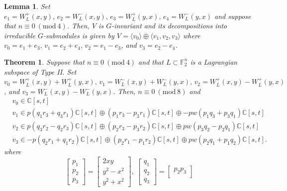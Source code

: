 \documentclass[10pt,a4paper]{amsart}
\newtheorem{lemma}{Lemma}
\newtheorem{theorem}{Theorem}
\begin{document}
\begin{lemma}\label{repG_n=0(4)}
    Set \(e_1 = W_L^+(x,y),\, e_2 = W_L^-(x,y),\, e_3 = W_L^+(y,x),\, e_4 = W_L^-(y,x)\) and suppose that \(n \equiv 0 \ (\textrm{mod}\ 4)\). Then, \(V\) is \(G\)-invariant and its decompositions into irreducible \(G\)-submodules is given by \(V = \langle v_0 \rangle \oplus \langle v_1, v_2, v_3 \rangle\) where \(v_0 = e_1 + e_3,\, v_1 = e_2 + e_4,\, v_2 = e_1 - e_3\), and \(v_3 = e_2 - e_4\).
\end{lemma}

\begin{theorem}\label{W_L:n=0(8)}
    Suppose that \(n \equiv 0 \ (\mathrm{mod}\ 4)\) and that \(L \subset \mathbb{F}_2^n\) is a Lagrangian subspace of Type II. Set \(v_0 = W_L^+(x,y) + W_L^+(y,x),\, v_1 = W_L^-(x,y) + W_L^-(y,x),\, v_2 = W_L^+(x,y) - W_L^+(y,x)\), and \(v_3 = W_L^-(x,y) - W_L^-(y,x)\). Then, \(n \equiv 0 \ (\mathrm{mod}\ 8)\) and
    \begin{align*}
        &v_0 \in \mathbb{C}[s,t] \\
        &v_1 \in p(q_1r_3+q_3r_1)\mathbb{C}[s,t] \oplus (p_1r_3 - p_3r_1)\mathbb{C}[s,t] \oplus -pw(p_1q_3+p_3q_1)\mathbb{C}[s,t] \\
        &v_2 \in p(q_3r_2-q_2r_3)\mathbb{C}[s,t] \oplus (p_2r_3 - p_3r_2)\mathbb{C}[s,t] \oplus pw(p_3q_2-p_2q_1)\mathbb{C}[s,t] \\
        &v_3 \in -p(q_2r_1+q_1r_2)\mathbb{C}[s,t] \oplus (p_2r_1 - p_1r_2)\mathbb{C}[s,t] \oplus pw(p_2q_1+p_1q_2)\mathbb{C}[s,t].
    \end{align*}
    where
    \begin{equation*}
        \begin{bmatrix}
            p_1 \\
            p_2 \\
            p_3
        \end{bmatrix}
        =
        \begin{bmatrix}
            2xy \\
            y^2-x^2 \\
            y^2+x^2
        \end{bmatrix}, \:
        \begin{bmatrix}
            q_1 \\
            q_2 \\
            q_3
        \end{bmatrix}
        =
        \begin{bmatrix}
            p_2p_3 \\

\end{bmatrix}
\end{equation*}
\end{theorem}
\end{document}
